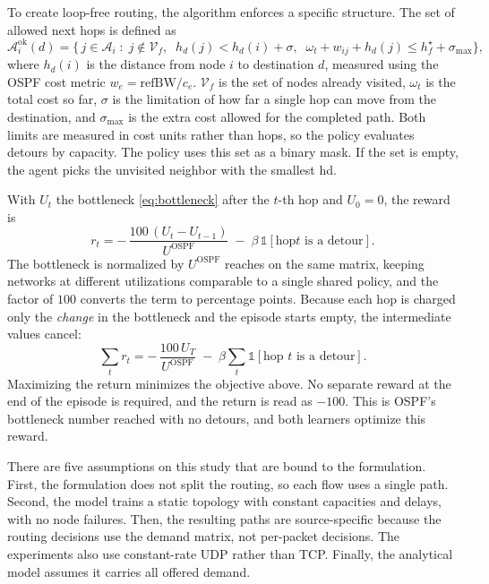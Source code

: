 To create loop-free routing, the algorithm enforces a specific structure. The set of allowed next hops is defined as   \begin{equation}\label{eq:mask}
\mathcal{A}^{\mathrm{ok}}_i(d)=\bigl\{\,j\in\mathcal{A}_i \;:\;
j\notin\mathcal{V}_f,\;\; h_d(j)<h_d(i)+\sigma,\;\;
\omega_t+w_{ij}+h_d(j)\le h^{\star}_f+\sigma_{\max}\bigr\},
\end{equation} where $h_d(i)$ is the distance from node $i$ to destination $d$, measured using the OSPF cost metric $w_e=\mathrm{refBW}/c_e$. $\mathcal{V}_f$ is the set of nodes already visited, $\omega_t$ is the total cost so far, $\sigma$ is the limitation of how far a single hop can move from the destination, and $\sigma_{\max}$ is the extra cost allowed for the completed path. Both limits are measured in cost units rather than hops, so the policy evaluates detours by capacity. The policy uses this set as a binary mask. If the set is empty, the agent picks the unvisited neighbor with the smallest hd.


With $U_t$ the bottleneck \eqref{eq:bottleneck} after the $t$-th hop and $U_0=0$,
the reward is
\begin{equation}\label{eq:reward}
r_t=-\,\frac{100\,(U_t-U_{t-1})}{U^{\mathrm{OSPF}}}\;-\;\beta\,\mathbb{1}\!\left[\text{hop
$t$ is a detour}\right].
\end{equation}
The bottleneck is normalized by $U^{\mathrm{OSPF}}$ reaches on the same matrix, keeping networks at different utilizations comparable to a single shared policy, and the factor of $100$ converts the term to percentage points. Because each hop is charged only the \emph{change} in the bottleneck and the episode
starts empty, the intermediate values cancel:
\begin{equation}\label{eq:telescope}
\sum_{t} r_t=-\,\frac{100\,U_T}{U^{\mathrm{OSPF}}}\;-\;\beta\sum_{t}
\mathbb{1}\!\left[\text{hop $t$ is a detour}\right].
\end{equation}
Maximizing the return minimizes the objective above. No separate reward at the end of the episode is required, and the return is read as $-100$. This is OSPF’s bottleneck number reached with no detours, and both learners optimize this reward.

There are five assumptions on this study that are bound to the formulation. First, the formulation does not split the routing, so each flow uses a single path. Second, the model trains a static topology with constant capacities and delays, with no node failures. Then, the resulting paths are source-specific because the routing decisions use the demand matrix, not per-packet decisions. The experiments also use constant-rate UDP rather than TCP. Finally, the analytical model assumes it carries all offered demand.


